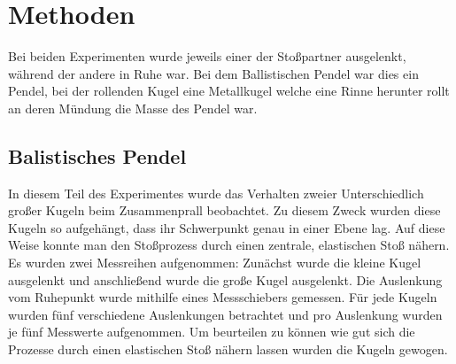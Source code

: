 \section{Methoden}

Bei beiden Experimenten wurde jeweils einer der Stoßpartner ausgelenkt, während der andere in Ruhe war. Bei dem Ballistischen Pendel war dies ein Pendel, bei der rollenden Kugel eine Metallkugel welche eine Rinne herunter rollt an deren Mündung die Masse des Pendel war.

\subsection*{Balistisches Pendel}
In diesem Teil des Experimentes wurde das Verhalten zweier Unterschiedlich großer Kugeln beim Zusammenprall beobachtet.
Zu diesem Zweck wurden diese Kugeln so aufgehängt, dass ihr Schwerpunkt genau in einer Ebene lag.
Auf diese Weise konnte man den Stoßprozess durch einen zentrale, elastischen Stoß nähern.
Es wurden zwei Messreihen aufgenommen: Zunächst wurde die kleine Kugel ausgelenkt und anschließend wurde die große Kugel ausgelenkt. Die Auslenkung vom Ruhepunkt wurde mithilfe eines Messschiebers gemessen.
Für jede Kugeln wurden fünf verschiedene Auslenkungen betrachtet und pro Auslenkung wurden je fünf Messwerte aufgenommen.
Um beurteilen zu können wie gut sich die Prozesse durch einen elastischen Stoß nähern lassen wurden die Kugeln gewogen.

